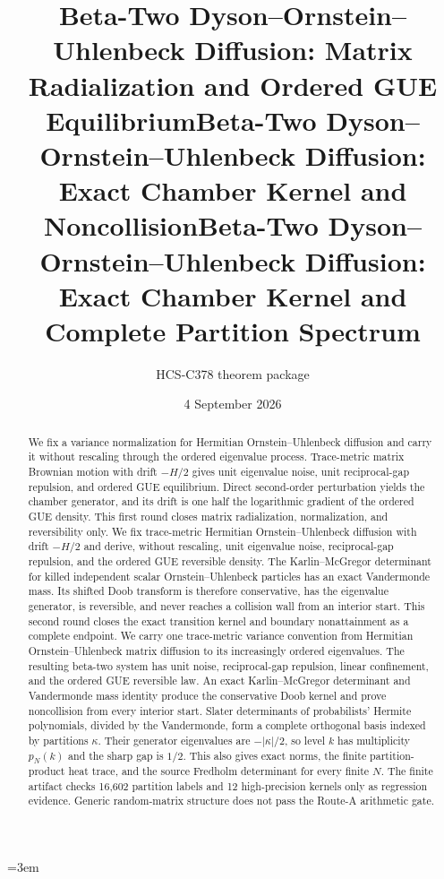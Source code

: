 \documentclass[10pt]{article}
\title{Beta-Two Dyson--Ornstein--Uhlenbeck Diffusion:
Matrix Radialization and Ordered GUE Equilibrium}
\title{Beta-Two Dyson--Ornstein--Uhlenbeck Diffusion:
Exact Chamber Kernel and Noncollision}
\title{Beta-Two Dyson--Ornstein--Uhlenbeck Diffusion:
Exact Chamber Kernel and Complete Partition Spectrum}
\author{HCS-C378 theorem package}
\date{4 September 2026}
\begin{document}
\emergencystretch=3em
\maketitle

\begin{abstract}
\ifcase\CRevisionRound
We fix a variance normalization for Hermitian Ornstein--Uhlenbeck diffusion
and carry it without rescaling through the ordered eigenvalue process.
Trace-metric matrix Brownian motion with drift $-H/2$ gives unit eigenvalue
noise, unit reciprocal-gap repulsion, and ordered GUE equilibrium.  Direct
second-order perturbation yields the chamber generator, and its drift is one
half the logarithmic gradient of the ordered GUE density.  This first round
closes matrix radialization, normalization, and reversibility only.
\or
We fix trace-metric Hermitian Ornstein--Uhlenbeck diffusion with drift
$-H/2$ and derive, without rescaling, unit eigenvalue noise, reciprocal-gap
repulsion, and the ordered GUE reversible density.  The
Karlin--McGregor determinant for killed independent scalar
Ornstein--Uhlenbeck particles has an exact Vandermonde mass.  Its shifted
Doob transform is therefore conservative, has the eigenvalue generator, is
reversible, and never reaches a collision wall from an interior start.
This second round closes the exact transition kernel and boundary
nonattainment as a complete endpoint.
\else
We carry one trace-metric variance convention from Hermitian
Ornstein--Uhlenbeck matrix diffusion to its increasingly ordered eigenvalues.
The resulting beta-two system has unit noise, reciprocal-gap repulsion,
linear confinement, and the ordered GUE reversible law.  An exact
Karlin--McGregor determinant and Vandermonde mass identity produce the
conservative Doob kernel and prove noncollision from every interior start.
Slater determinants of probabilists' Hermite polynomials, divided by the
Vandermonde, form a complete orthogonal basis indexed by partitions
$\kappa$.  Their generator eigenvalues are $-|\kappa|/2$, so level $k$ has
multiplicity $p_N(k)$ and the sharp gap is $1/2$.  This also gives exact
norms, the finite partition-product heat trace, and the source Fredholm
determinant for every finite $N$.
The finite artifact checks 16,602 partition labels and 12 high-precision
kernels only as regression evidence.  Generic random-matrix structure does
not pass the Route-A arithmetic gate.
\fi
\end{abstract}
\end{document}
